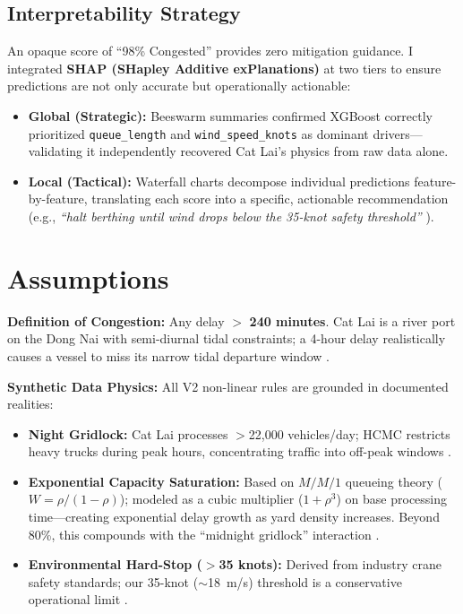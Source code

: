 \documentclass[11pt, a4paper]{article}
\begin{document}
\subsection{Interpretability Strategy}

An opaque score of ``98\% Congested'' provides zero mitigation guidance. I integrated \textbf{SHAP (SHapley Additive exPlanations)} at two tiers to ensure predictions are not only accurate but operationally actionable:
\begin{itemize}[nosep, leftmargin=1.5em]
    \item \textbf{Global (Strategic):} Beeswarm summaries confirmed XGBoost correctly prioritized \texttt{queue\_length} and \texttt{wind\_speed\_knots} as dominant drivers---validating it independently recovered Cat Lai's physics from raw data alone.
    \item \textbf{Local (Tactical):} Waterfall charts decompose individual predictions feature-by-feature, translating each score into a specific, actionable recommendation (e.g., \textit{``halt berthing until wind drops below the 35-knot safety threshold''} \cite{pema_wind}).
\end{itemize}

\section{Assumptions}

\textbf{Definition of Congestion:} Any delay $>$ \textbf{240 minutes}. Cat Lai is a river port on the Dong Nai with semi-diurnal tidal constraints; a 4-hour delay realistically causes a vessel to miss its narrow tidal departure window \cite{saigon_newport}.

\textbf{Synthetic Data Physics:} All V2 non-linear rules are grounded in documented realities:
\begin{itemize}[nosep, leftmargin=1.5em]
    \item \textbf{Night Gridlock:} Cat Lai processes $>$22,000 vehicles/day; HCMC restricts heavy trucks during peak hours, concentrating traffic into off-peak windows \cite{vietnamnet_catlai}.
    \item \textbf{Exponential Capacity Saturation:} Based on $M/M/1$ queueing theory ($W = \rho / (1-\rho)$); modeled as a cubic multiplier ($1 + \rho^3$) on base processing time---creating exponential delay growth as yard density increases. Beyond 80\%, this compounds with the ``midnight gridlock'' interaction \cite{mm1_queue}.
    \item \textbf{Environmental Hard-Stop ($>$35 knots):} Derived from industry crane safety standards; our 35-knot ($\sim$18~m/s) threshold is a conservative operational limit \cite{pema_wind}.
\end{itemize}
\end{document}
